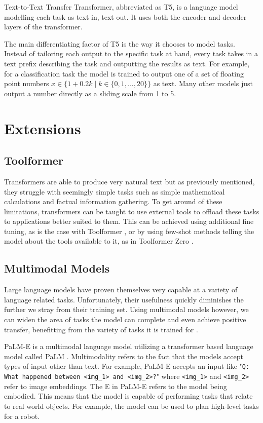 \documentclass[twoside]{article}
\begin{document}
Text-to-Text Transfer Transformer, abbreviated as T5, is a language model modelling each
task as text in, text out. It uses both the encoder and decoder layers of the transformer.
\cite{raffel_exploring_2020}

The main differentiating factor of T5 is the way it chooses to model tasks. Instead of 
tailoring each output to the specific task at hand, every task takes in a text prefix
describing the task and outputting the results as text. For example, for a classification
task the model is trained to output one of a set of floating point numbers 
$x \in \{ 1+0.2k \mid k \in \{ 0, 1, ..., 20\} \}$ as text. Many other models just 
output a number directly as a sliding scale from 1 to 5. 

\section{Extensions}

\subsection{Toolformer}
Transformers are able to produce very natural text but as previously mentioned, they struggle with seemingly
simple tasks such as simple mathematical calculations and factual information gathering.
To get around of these limitations, transformers can be taught to use external tools
to offload these tasks to applications better suited to them. \cite{schick_toolformer_2023} 
This can be achieved using additional fine tuning, as is the case with Toolformer
\cite{schick_toolformer_2023}, or by using few-shot methods telling the model 
about the tools available to it, as in Toolformer Zero \cite{minosvasilias_markus_toolformer_2023}.

\subsection{Multimodal Models}
Large language models have proven themselves very capable at a variety of language related
tasks. Unfortunately, their usefulness quickly diminishes the further we stray from their training set.
Using multimodal models however, we can widen the area of tasks the model
can complete and even achieve positive transfer, benefitting from the variety of tasks
it is trained for \cite{driess_palm-e_2023}. 

PaLM-E is a multimodal language model utilizing a transformer based language model called
PaLM \cite{chowdhery_palm_2022,driess_palm-e_2023}. Multimodality refers to the fact that
the models accept types of input other than text. For example, PaLM-E accepts an input like
"\texttt{Q: What happened between <img\_1> and <img\_2>?}" \cite{driess_palm-e_2023} where
\texttt{<img\_1>} and \texttt{<img\_2>} refer to image embeddings. The E in PaLM-E refers to
the model being embodied. This means that the model is capable of performing tasks that
relate to real world objects. For example, the model can be used to plan high-level tasks
for a robot. \cite{driess_palm-e_2023}
\end{document}
